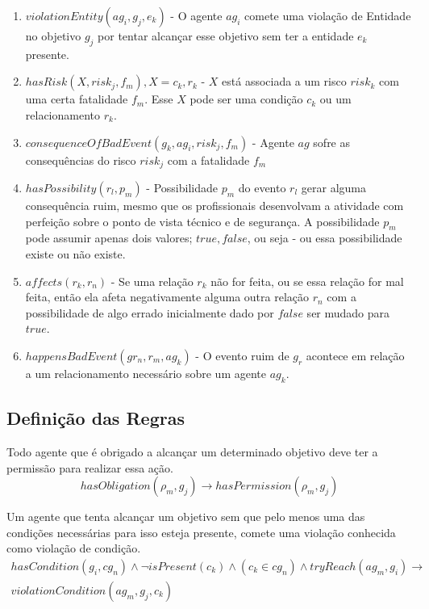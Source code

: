 \documentclass[12pt]{article}
\begin{document}
\begin{enumerate}
	\item $violationEntity(ag_i,g_j,e_k)$ - O agente $ag_i$ comete uma violação de Entidade no objetivo $g_j$ por tentar alcançar esse objetivo sem ter a entidade $e_k$ presente.  	
	\item $hasRisk(X,risk_j,f_m), X = c_k,r_k$ - $X$ está associada a um risco $risk_k$ com uma certa fatalidade $f_m$. Esse $X$ pode ser uma condição $c_k$ ou um relacionamento $r_k$. 
	\item $consequenceOfBadEvent(g_k,ag_i,risk_j,f_m)$ - Agente $ag$ sofre as consequências do risco $risk_j$ com a fatalidade $f_m$
	\item $hasPossibility(r_l,p_m)$ - Possibilidade $p_m$ do evento $r_l$ gerar alguma consequência ruim, mesmo que os profissionais desenvolvam a atividade com perfeição sobre o ponto de vista técnico e de segurança. A possibilidade $p_m$ pode assumir apenas dois valores; $true,false$, ou seja - ou essa possibilidade existe ou não existe. 	
	\item $affects(r_k,r_n)$ - Se uma relação $r_k$ não for feita, ou se essa relação for mal feita, então ela afeta negativamente alguma outra relação $r_n$ com a possibilidade de algo errado inicialmente dado por $false$ ser mudado para $true$. 	
	\item $happensBadEvent(gr_n,r_m,ag_k)$ - O evento ruim de $g_r$ acontece em relação a um relacionamento necessário sobre um agente $ag_k$. 		
\end{enumerate}

\subsection{Definição das Regras}

Todo agente que é obrigado a alcançar um determinado objetivo deve ter a permissão para realizar essa ação.
\begin{equation}\label{rel1}
	hasObligation(\rho_m,g_j) \to hasPermission(\rho_m,g_j)  
\end{equation}

Um agente que tenta alcançar um objetivo sem que pelo menos uma das condições necessárias para isso esteja presente, comete uma violação conhecida como violação de condição.
\begin{eqnarray}\label{rel3}\nonumber
	hasCondition(g_i,cg_n) \wedge \neg isPresent(c_k) \wedge (c_k \in cg_n) \wedge tryReach(ag_m,g_i) \to \nonumber \\  
	violationCondition(ag_m,g_j,c_k) 
\end{eqnarray}
\end{document}
